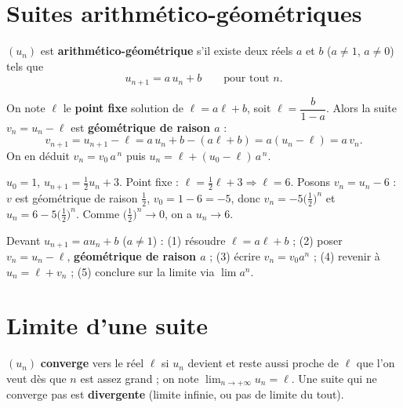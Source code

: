 \section{Suites arithmético-géométriques}

\begin{definition}
$(u_n)$ est \textbf{arithmético-géométrique} s'il existe deux réels $a$ et $b$ ($a\neq1$, $a\neq0$) tels que
\[
u_{n+1}=a\,u_n+b\qquad\text{pour tout }n.
\]
\end{definition}

\begin{propriete}
On note $\ell$ le \textbf{point fixe} solution de $\ell=a\ell+b$, soit $\ell=\dfrac{b}{1-a}$.
Alors la suite $v_n=u_n-\ell$ est \textbf{géométrique de raison $a$} :
\[
v_{n+1}=u_{n+1}-\ell=a\,u_n+b-(a\ell+b)=a(u_n-\ell)=a\,v_n.
\]
On en déduit $v_n=v_0\,a^{\,n}$ puis $u_n=\ell+(u_0-\ell)\,a^{\,n}$.
\end{propriete}

\begin{exemple}
$u_0=1$, $u_{n+1}=\tfrac12 u_n+3$. Point fixe : $\ell=\tfrac12\ell+3\Rightarrow\ell=6$.
Posons $v_n=u_n-6$ : $v$ est géométrique de raison $\tfrac12$, $v_0=1-6=-5$, donc
$v_n=-5\bigl(\tfrac12\bigr)^n$ et $u_n=6-5\bigl(\tfrac12\bigr)^n$.
Comme $\bigl(\tfrac12\bigr)^n\to0$, on a $u_n\to6$.
\end{exemple}

\begin{aretenir}
Devant $u_{n+1}=au_n+b$ ($a\ne1$) : (1) résoudre $\ell=a\ell+b$ ; (2) poser $v_n=u_n-\ell$,
\textbf{géométrique de raison $a$} ; (3) écrire $v_n=v_0a^n$ ; (4) revenir à $u_n=\ell+v_n$ ;
(5) conclure sur la limite via $\lim a^n$.
\end{aretenir}

\section{Limite d'une suite}

\begin{definition}
$(u_n)$ \textbf{converge} vers le réel $\ell$ si $u_n$ devient et reste aussi proche de $\ell$ que
l'on veut dès que $n$ est assez grand ; on note $\displaystyle\lim_{n\to+\infty}u_n=\ell$.
Une suite qui ne converge pas est \textbf{divergente} (limite infinie, ou pas de limite du tout).
\end{definition}

